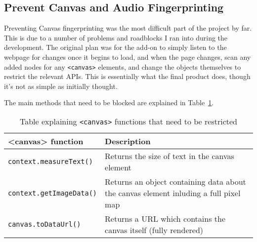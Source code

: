 \subsection{Prevent Canvas and Audio Fingerprinting}

Preventing Canvas fingerprinting was the most difficult part of the project by far.
This is due to a number of problems and roadblocks I ran into during the development.
The original plan was for the add-on to simply listen to the webpage for changes once it begins to load, and when the page changes, scan any added nodes for any \texttt{<canvas>} elements, and change the objects themselves to restrict the relevant APIs.
This is essentially what the final product does, though it's not as simple as initially thought.

The main methods that need to be blocked are explained in Table~\ref{tab:canvas-methods}.

\begin{table}[h]
\centering
\begin{tabular}{| p{6cm} | p{8cm} |}
    \hline
    \textbf{<canvas> function} & \textbf{Description} \\ \hline
    \texttt{context.measureText()} & {Returns the size of text in the canvas element} \\ \hline
    \texttt{context.getImageData()} & {Returns an object containing data about \newline the canvas element inluding a full pixel map} \\ \hline
    \texttt{canvas.toDataUrl()} & {Returns a URL which contains the canvas \newline itself (fully rendered)} \\
    \hline
\end{tabular}
\caption{Table explaining \texttt{<canvas>} functions that need to be restricted}
\label{tab:canvas-methods}
\end{table}




